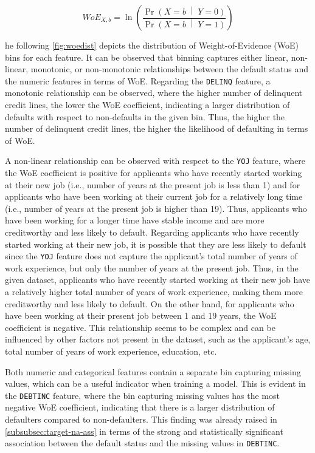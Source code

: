         \begin{equation}\label{eq}
            WoE_{X, b}= \ln \left(\frac{\Pr{\left(X = b\;\middle|\;Y = 0\right)}}{\Pr{\left(X = b\;\middle|\;Y = 1\right)}}\right)
        \end{equation}
        
        he following \autoref{fig:woedist} depicts the distribution of Weight-of-Evidence (WoE) bins for each feature. It can be observed that binning captures either linear, non-linear, monotonic, or non-monotonic relationships between the default status and the numeric features in terms of WoE.
        Regarding the \texttt{DELINQ} feature, a monotonic relationship can be observed, where the higher number of delinquent credit lines, the lower the WoE coefficient, indicating a larger distribution of defaults with respect to non-defaults in the given bin.
        Thus, the higher the number of delinquent credit lines, the higher the likelihood of defaulting in terms of WoE.
        
        A non-linear relationship can be observed with respect to the \texttt{YOJ} feature, where the WoE coefficient is positive for applicants who have recently started working at their new job (i.e., number of years at the present job is less than 1) and for applicants who have been working at their current job for a relatively long time (i.e., number of years at the present job is higher than 19).
        Thus, applicants who have been working for a longer time have stable income and are more creditworthy and less likely to default.
        Regarding applicants who have recently started working at their new job, it is possible that they are less likely to default since the \texttt{YOJ} feature does not capture the applicant's total number of years of work experience, but only the number of years at the present job.
        Thus, in the given dataset, applicants who have recently started working at their new job have a relatively higher total number of years of work experience, making them more creditworthy and less likely to default. On the other hand, for applicants who have been working at their present job between 1 and 19 years, the WoE coefficient is negative.
        This relationship seems to be complex and can be influenced by other factors not present in the dataset, such as the applicant's age, total number of years of work experience, education, etc.
        
        Both numeric and categorical features contain a separate bin capturing missing values, which can be a useful indicator when training a model. This is evident in the \texttt{DEBTINC} feature, where the bin capturing missing values has the most negative WoE coefficient, indicating that there is a larger distribution of defaulters compared to non-defaulters.
        This finding was already raised in \autoref{subsubsec:target-na-ass} in terms of the strong and statistically significant association between the default status and the missing values in \texttt{DEBTINC}.
        
